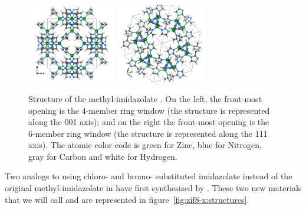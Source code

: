 \documentclass[thesis]{subfiles}
\begin{document}
\begin{figure}[ht]
    \centering
    \includegraphics[width=0.35\textwidth]{figures/images/ZIF8-100}
    \hspace{2em}
    \includegraphics[width=0.35\textwidth]{figures/images/ZIF8-111}
    \caption{Structure of the methyl-imidazolate . On the left, the
    front-most opening is the 4-member ring window (the structure is represented
    along the 001 axis); and on the right the front-most opening is the 6-member
    ring window (the structure is represented along the 111 axis). The atomic
    color code is green for Zinc, blue for Nitrogen, gray for Carbon and white
    for Hydrogen.}
    \label{fig:zif8-ch3:structure}
\end{figure}

Two analogs to  using chloro- and bromo- substituted imidazolate instead of
the original methyl-imidazolate in  have first synthesized by
\citeauthor{Li2009}\cite{Li2009}. These two new materials that we will call
\ZIFCl and \ZIFBr are represented in figure~\ref{fig:zif8-x:structures}.
\end{document}
